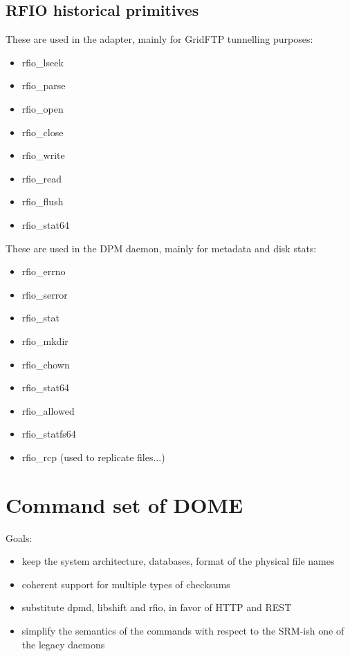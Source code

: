 \documentclass[a4paper,10pt]{scrreprt}
\begin{document}
\subsection{RFIO historical primitives}

 These are used in the adapter, mainly for GridFTP tunnelling purposes:\\

\begin{itemize}
\item rfio\_lseek
\item rfio\_parse
\item rfio\_open
\item rfio\_close
\item rfio\_write
\item rfio\_read
\item rfio\_flush
\item rfio\_stat64
\end{itemize}


 These are used in the DPM daemon, mainly for metadata and disk stats:\\

\begin{itemize}
\item rfio\_errno
\item rfio\_serror
\item rfio\_stat
\item rfio\_mkdir
\item rfio\_chown
\item rfio\_stat64
\item rfio\_allowed
\item rfio\_statfs64
\item rfio\_rcp (used to replicate files...)
\end{itemize}


\section{Command set of DOME}
Goals:

\begin{itemize}
\item keep the system architecture, databases, format of the physical file names
\item coherent support for multiple types of checksums
\item substitute dpmd, libshift and rfio, in favor of HTTP and REST
\item simplify the semantics of the commands with respect to the SRM-ish one of the legacy daemons
\end{itemize}
\end{document}
